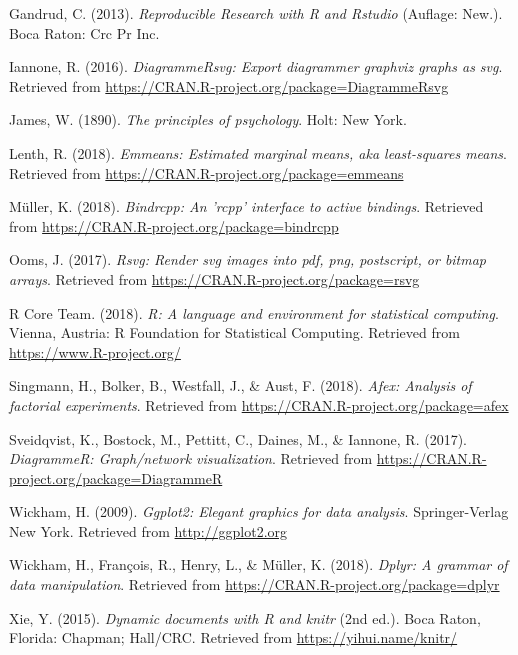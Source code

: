 \documentclass[man,floatsintext]{apa6}
\theoremstyle{definition}
\theoremstyle{definition}
\theoremstyle{definition}
\theoremstyle{remark}
\begin{document}
\hypertarget{ref-gandrud_reproducible_2013}{}
Gandrud, C. (2013). \emph{Reproducible Research with R and Rstudio}
(Auflage: New.). Boca Raton: Crc Pr Inc.

\hypertarget{ref-R-DiagrammeRsvg}{}
Iannone, R. (2016). \emph{DiagrammeRsvg: Export diagrammer graphviz
graphs as svg}. Retrieved from
\url{https://CRAN.R-project.org/package=DiagrammeRsvg}

\hypertarget{ref-james_1890}{}
James, W. (1890). \emph{The principles of psychology}. Holt: New York.

\hypertarget{ref-R-emmeans}{}
Lenth, R. (2018). \emph{Emmeans: Estimated marginal means, aka
least-squares means}. Retrieved from
\url{https://CRAN.R-project.org/package=emmeans}

\hypertarget{ref-R-bindrcpp}{}
Müller, K. (2018). \emph{Bindrcpp: An 'rcpp' interface to active
bindings}. Retrieved from
\url{https://CRAN.R-project.org/package=bindrcpp}

\hypertarget{ref-R-rsvg}{}
Ooms, J. (2017). \emph{Rsvg: Render svg images into pdf, png,
postscript, or bitmap arrays}. Retrieved from
\url{https://CRAN.R-project.org/package=rsvg}

\hypertarget{ref-R-base}{}
R Core Team. (2018). \emph{R: A language and environment for statistical
computing}. Vienna, Austria: R Foundation for Statistical Computing.
Retrieved from \url{https://www.R-project.org/}

\hypertarget{ref-R-afex}{}
Singmann, H., Bolker, B., Westfall, J., \& Aust, F. (2018). \emph{Afex:
Analysis of factorial experiments}. Retrieved from
\url{https://CRAN.R-project.org/package=afex}

\hypertarget{ref-R-DiagrammeR}{}
Sveidqvist, K., Bostock, M., Pettitt, C., Daines, M., \& Iannone, R.
(2017). \emph{DiagrammeR: Graph/network visualization}. Retrieved from
\url{https://CRAN.R-project.org/package=DiagrammeR}

\hypertarget{ref-R-ggplot2}{}
Wickham, H. (2009). \emph{Ggplot2: Elegant graphics for data analysis}.
Springer-Verlag New York. Retrieved from \url{http://ggplot2.org}

\hypertarget{ref-R-dplyr}{}
Wickham, H., François, R., Henry, L., \& Müller, K. (2018). \emph{Dplyr:
A grammar of data manipulation}. Retrieved from
\url{https://CRAN.R-project.org/package=dplyr}

\hypertarget{ref-R-knitr}{}
Xie, Y. (2015). \emph{Dynamic documents with R and knitr} (2nd ed.).
Boca Raton, Florida: Chapman; Hall/CRC. Retrieved from
\url{https://yihui.name/knitr/}

\endgroup
\end{document}
